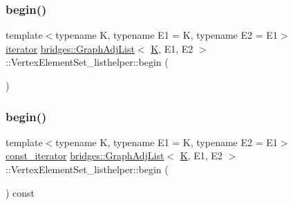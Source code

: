 \subsubsection{\texorpdfstring{begin()}{begin()}\hspace{0.1cm}{\footnotesize\ttfamily [1/2]}}
{\footnotesize\ttfamily template$<$typename K, typename E1 = K, typename E2 = E1$>$ \\
\hyperlink{classbridges_1_1_graph_adj_list_1_1_vertex_element_set__listhelper_1_1iterator}{iterator} \hyperlink{classbridges_1_1_graph_adj_list}{bridges\+::\+Graph\+Adj\+List}$<$ \hyperlink{namespacebridges_acfb0a4f7877d8f63de3e6862004c50edaa5f3c6a11b03839d46af9fb43c97c188}{K}, E1, E2 $>$\+::Vertex\+Element\+Set\+\_\+listhelper\+::begin (\begin{DoxyParamCaption}{ }\end{DoxyParamCaption})\hspace{0.3cm}{\ttfamily [inline]}}

\mbox{\label{classbridges_1_1_graph_adj_list_1_1_vertex_element_set__listhelper_a9021945bdb83e3735fbc9b9a42f39a39}} 
\subsubsection{\texorpdfstring{begin()}{begin()}\hspace{0.1cm}{\footnotesize\ttfamily [2/2]}}
{\footnotesize\ttfamily template$<$typename K, typename E1 = K, typename E2 = E1$>$ \\
\hyperlink{classbridges_1_1_graph_adj_list_1_1_vertex_element_set__listhelper_1_1const__iterator}{const\+\_\+iterator} \hyperlink{classbridges_1_1_graph_adj_list}{bridges\+::\+Graph\+Adj\+List}$<$ \hyperlink{namespacebridges_acfb0a4f7877d8f63de3e6862004c50edaa5f3c6a11b03839d46af9fb43c97c188}{K}, E1, E2 $>$\+::Vertex\+Element\+Set\+\_\+listhelper\+::begin (\begin{DoxyParamCaption}{ }\end{DoxyParamCaption}) const\hspace{0.3cm}{\ttfamily [inline]}}

